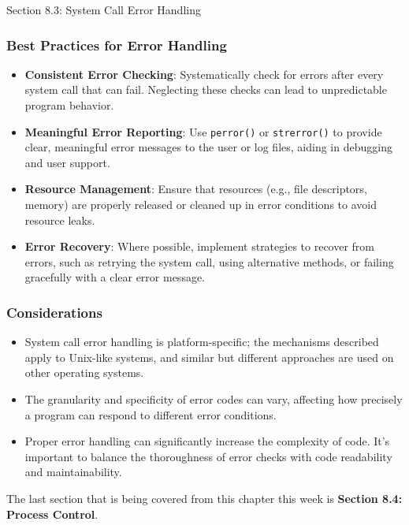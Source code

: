 \begin{notes}{Section 8.3: System Call Error Handling}
    \subsubsection*{Best Practices for Error Handling}
    
    \begin{itemize}
        \item \textbf{Consistent Error Checking}: Systematically check for errors after every system call that can fail. Neglecting these checks can lead to unpredictable program behavior.
        \item \textbf{Meaningful Error Reporting}: Use \texttt{perror()} or \texttt{strerror()} to provide clear, meaningful error messages to the user or log files, aiding in debugging and user support.
        \item \textbf{Resource Management}: Ensure that resources (e.g., file descriptors, memory) are properly released or cleaned up in error conditions to avoid resource leaks.
        \item \textbf{Error Recovery}: Where possible, implement strategies to recover from errors, such as retrying the system call, using alternative methods, or failing gracefully with a clear error message.
    \end{itemize}
    
    \subsubsection*{Considerations}
    
    \begin{itemize}
        \item System call error handling is platform-specific; the mechanisms described apply to Unix-like systems, and similar but different approaches are used on other operating systems.
        \item The granularity and specificity of error codes can vary, affecting how precisely a program can respond to different error conditions.
        \item Proper error handling can significantly increase the complexity of code. It's important to balance the thoroughness of error checks with code readability and maintainability.
    \end{itemize}    
\end{notes}

The last section that is being covered from this chapter this week is \textbf{Section 8.4: Process Control}.

